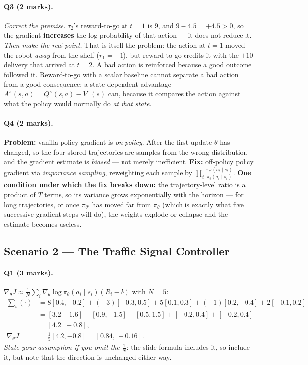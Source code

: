 \documentclass[11pt,a4paper]{article}
\begin{document}
\paragraph{Q3 (2 marks).} \emph{Correct the premise.} $\tau_2$'s reward-to-go
at $t=1$ is $9$, and $9-4.5=+4.5>0$, so the gradient \textbf{increases} the
log-probability of that action --- it does not reduce it. \emph{Then make the
real point.} That is itself the problem: the action at $t=1$ moved the robot
\emph{away} from the shelf ($r_1=-1$), but reward-to-go credits it with the
$+10$ delivery that arrived at $t=2$. A bad action is reinforced because a
good outcome followed it. Reward-to-go with a scalar baseline cannot separate
a bad action from a good consequence; a state-dependent advantage
$A^\pi(s,a)=Q^\pi(s,a)-V^\pi(s)$ can, because it compares the action against
what the policy would normally do \emph{at that state}.

\paragraph{Q4 (2 marks).} \textbf{Problem:} vanilla policy gradient is
\emph{on-policy}. After the first update $\theta$ has changed, so the four
stored trajectories are samples from the wrong distribution and the gradient
estimate is \emph{biased} --- not merely inefficient.
\textbf{Fix:} off-policy policy gradient via \emph{importance sampling},
reweighting each sample by
$\prod_{t}\frac{\pi_{\theta'}(a_t\mid s_t)}{\pi_\theta(a_t\mid s_t)}$.
\textbf{One condition under which the fix breaks down:} the trajectory-level
ratio is a product of $T$ terms, so its variance grows exponentially with the
horizon --- for long trajectories, or once $\pi_{\theta'}$ has moved far from
$\pi_\theta$ (which is exactly what five successive gradient steps will do),
the weights explode or collapse and the estimate becomes useless.

\subsection{Scenario 2 --- The Traffic Signal Controller}

\paragraph{Q1 (3 marks).}
$\nabla_\theta J\approx\frac1N\sum_i \nabla_\theta\log\pi_\theta(a_i\mid s_i)(R_i-b)$
with $N=5$:
\begin{align*}
\textstyle\sum_i(\cdot) &= 8[0.4,-0.2]+(-3)[-0.3,0.5]+5[0.1,0.3]+(-1)[0.2,-0.4]+2[-0.1,0.2]\\
&= [3.2,-1.6]+[0.9,-1.5]+[0.5,1.5]+[-0.2,0.4]+[-0.2,0.4]\\
&= [4.2,\,-0.8],\\
\nabla_\theta J &= \tfrac15[4.2,-0.8]=\mathbf{[0.84,\,-0.16]}.
\end{align*}
\emph{State your assumption if you omit the $\tfrac1N$}: the slide formula
includes it, so include it, but note that the direction is unchanged either way.
\end{document}
